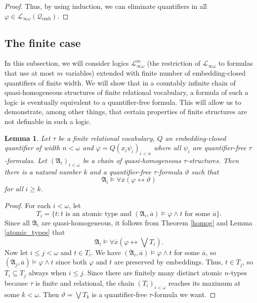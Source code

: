 \documentclass{ndjflart}
\theoremstyle{plain}
\newtheorem{lemma}[conjecture]{Lemma}
\theoremstyle{definition}
\numberwithin{equation}{section}
\DeclareMathOperator{\emb}{emb}
\begin{document}
\begin{proof}
Thus, by using induction, we can eliminate quantifiers in all $\varphi \in \mathcal{L}_{\infty\omega}(\mathcal{Q}_{\emb})$.
\end{proof}

\subsection{The finite case}

In this subsection, we will consider logics $\mathcal{L}_{\infty\omega}^m$ (the restriction of $\mathcal{L}_{\infty\omega}$ to formulas that use at most $m$ variables) extended with finite number of em\-bed\-ding-closed quantifiers of finite width.
We will show that in a countably infinite chain of quasi-homogeneous structures of finite relational vocabulary,
a formula of such a logic is eventually equivalent to a quantifier-free formula.
This will allow us to demonstrate, among other things, that certain properties of finite structures are not definable in such a logic.



\begin{lemma}\label{quant_elim_finite_lemma}
Let $\tau$ be a finite relational vocabulary,
$Q$ an embedding-closed quantifier of width $n<\omega$ and $\varphi = Q(x_i\psi_i)_{i<n}$ where all $\psi_i$ are quantifier-free $\tau$-formulas.
Let $(\mathfrak{A}_i)_{i<\omega}$ be a chain of quasi-homogeneous $\tau$-structures.
Then there is a natural number $k$ and a quantifier-free $\tau$-formula $\vartheta$ such that
\[
	\mathfrak{A}_i \vDash \forall \overline{x}(\varphi \leftrightarrow \vartheta)
\]
for all $i \geq k$.
\end{lemma}
\begin{proof}
For each $i < \omega$, let
\[
	T_i = \{t \colon t \text{ is an atomic type and } (\mathfrak{A}_i,\overline{a}) \vDash \varphi \wedge  t \text{ for some } \overline{a} \}.
\]
Since all $\mathfrak{A}_i$ are quasi-homogeneous, it follows from Theorem \ref{homog} and Lemma \ref{atomic_types} that
\[
	\mathfrak{A}_i \vDash \forall \overline{x}(\varphi \leftrightarrow \bigvee T_i).
\]
Now let $i \leq j < \omega$ and $t \in T_i$. We have $(\mathfrak{A}_i,\overline{a}) \vDash \varphi \wedge t$ for some $\overline{a}$, so $(\mathfrak{A}_j,\overline{a}) \vDash \varphi \wedge t$ since both $\varphi$ and $t$ are preserved by embeddings. Thus, $t \in T_j$, so $T_i \subseteq T_j$ always when $i \leq j$.
Since there are finitely many distinct atomic $n$-types because $\tau$ is finite and relational, the chain $(T_i)_{i < \omega}$ reaches its maximum at some $k < \omega$. Then $\vartheta = \bigvee T_k$ is a quantifier-free $\tau$-formula we want.
\end{proof}
\end{document}
